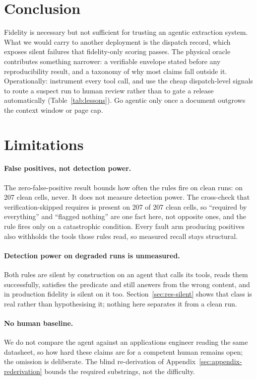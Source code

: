 \documentclass[11pt]{article}
\begin{document}
\section{Conclusion}
\label{sec:conclusion}
Fidelity is necessary but not sufficient for trusting an agentic
extraction system. What we would carry to another deployment is the
dispatch record, which exposes silent failures that fidelity-only
scoring passes. The physical oracle contributes something narrower: a
verifiable envelope stated before any reproducibility result, and a
taxonomy of why most claims fall outside it. Operationally: instrument
every tool call, and use the cheap dispatch-level signals to route a
suspect run to human review rather than to gate a release automatically
(Table~\ref{tab:lessons}). Go agentic only once a document outgrows the
context window or page cap.

\section*{Limitations}
\label{sec:limitations}
\paragraph{False positives, not detection power.}
The zero-false-positive result bounds how often the rules fire on clean
runs: on 207 clean cells, never. It does not measure detection power. The
cross-check that verification-skipped requires is present on 207 of 207
clean cells, so ``required by everything'' and ``flagged nothing'' are
one fact here, not opposite ones, and the rule fires only on a
catastrophic condition. Every fault arm producing positives also
withholds the tools those rules read, so measured recall stays
structural.

\paragraph{Detection power on degraded runs is unmeasured.}
Both rules are silent by construction on an agent that calls its tools,
reads them successfully, satisfies the predicate and still answers from
the wrong content, and in production fidelity is silent on it too.
Section~\ref{sec:res-silent} shows that class is real rather than
hypothesising it; nothing here separates it from a clean run.

\paragraph{No human baseline.}
We do not compare the agent against an applications engineer reading the
same datasheet, so how hard these claims are for a competent human
remains open; the omission is deliberate. The blind re-derivation of Appendix~\ref{sec:appendix-rederivation} bounds the required substrings, not the difficulty.
\end{document}

